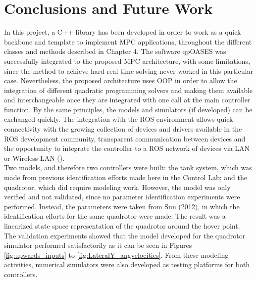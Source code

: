 \chapter{Conclusions and Future Work}
\label{chap:Conclusions_and_Future_Work}

In this project, a C++ library has been developed in order to work as a quick backbone and template to implement MPC applications, throughout  the different classes and methods described in Chapter 4. The software qpOASES was successfully integrated to the proposed MPC architecture, with some limitations, since the method to achieve hard real-time solving never worked in this particular case. Nevertheless, the proposed architecture uses OOP in order to allow the integration of different quadratic programming solvers and making them available and interchangeable once they are integrated with one call at the main controller function. By the same principles, the models and simulators (if developed) can be exchanged quickly. The integration with the ROS environment allows quick connectivity with the growing collection of devices and drivers available in the ROS development community, transparent communication between devices and the opportunity to integrate the controller to a ROS network of devices via LAN or Wireless LAN ().  \\ 

Two models, and therefore two controllers were built: the tank system, which was made from previous identification efforts made here in the Control Lab; and the quadrotor, which did require modeling work. However, the model was only verified and not validated, since no parameter identification experiments were performed. Instead, the parameters were taken from Sun \cite{YueSun2012} (2012), in which the identification efforts for the same quadrotor were made. The result was a linearized state space representation of the quadrotor around the hover point. The validation experiments showed that the model developed for the quadrotor simulator performed satisfactorily as it can be seen in Figures \ref{fig:upwards_inputs} to \ref{fig:LateralY_angvelocities}. From these modeling activities, numerical simulators were also developed as testing platforms for both controllers. \\

